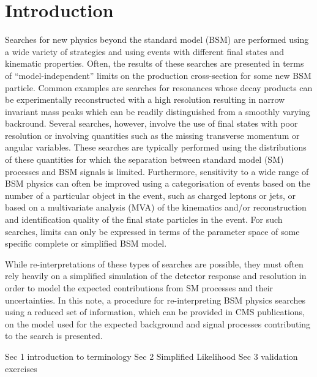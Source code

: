 \section{Introduction}
\label{sec:intro}

Searches for new physics beyond the standard model (BSM) are performed using a wide variety of 
strategies and using events with different final states and kinematic properties.  Often, 
the results of these searches are presented in terms of ``model-independent'' limits on the production 
cross-section for some new BSM particle. Common examples are searches for resonances whose decay products 
can be experimentally reconstructed with a high resolution resulting in narrow invariant mass peaks which can be readily distinguished from 
a smoothly varying backround. Several searches, however, involve the use of final states with poor resolution or involving 
quantities such as the missing transverse momentum \ptvecmiss or angular variables. These searches are typically performed using the 
distributions of these quantities for which the separation between standard model (SM) processes and BSM signals is limited. Furthermore, 
sensitivity to a wide range of BSM physics can often be improved using a categorisation of events based on the number of a particular 
object in the event, such as charged leptons or jets, or based on a multivariate analysis (MVA) of the kinematics and/or reconstruction and 
identification quality of the final state particles in the event. For such searches, limits can only be expressed in terms of the 
parameter space of some specific complete or simplified BSM model.

While re-interpretations of these types of searches are possible, they must often rely heavily on a simplified simulation of 
the detector response and resolution in order to model the expected contributions from SM processes and their uncertainties. 
In this note, a procedure for re-interpreting BSM physics searches using a reduced set of information, which can be provided in CMS publications, 
on the model used for the expected background and signal processes contributing to the search is presented. 

Sec 1 introduction to terminology 
Sec 2 Simplified Likelihood 
Sec 3 validation exercises



